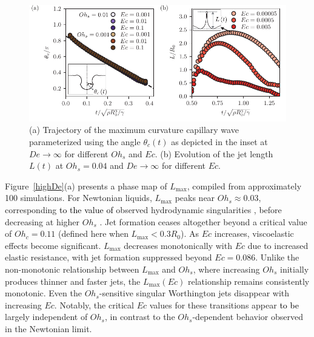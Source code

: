 \documentclass{jfm}
\newcommand{\DL}[1]{{\textcolor{black}{#1}}}
\newcommand{\AO}[1]{{\textcolor{black}{#1}}}
\begin{document}
\begin{figure}
	\includegraphics[width=\textwidth]{theta_t_02-eps-converted-to.pdf}
	\caption{(a) Trajectory of the maximum curvature capillary wave parameterized using the angle $\theta_c(t)$ as depicted in the inset at $De \to \infty$ for different $Oh_s$ and $Ec$. (b) Evolution of the jet length $L(t)$ at $Oh_s = 0.04$ and $De \to \infty$ for different $Ec$.}
	\label{theta_time}
\end{figure}

Figure~\ref{highDe}(a) presents a phase map of $L_{\text{max}}$, compiled from approximately 100 simulations.
For Newtonian liquids, $L_{\text{max}}$ peaks near $Oh_s \approx 0.03$, corresponding \AO{to the value of} observed hydrodynamic singularities \citep{zeff2000singularity,lohse2003bubble,eggers2015singularities,yang2020multitude}, before decreasing at higher $Oh_s$ \citep{duchemin2002jet,deike2018dynamics,gordillo2019capillary}.
Jet formation ceases altogether beyond a critical value of $Oh_c = 0.11$ \citep{sanjay2021bursting} (defined here when $L_\text{max} < 0.3R_0$).
As $Ec$ increases, viscoelastic effects become significant. $L_{\text{max}}$ decreases monotonically with $Ec$ due to increased elastic resistance, with jet formation suppressed beyond $Ec=0.086$. Unlike the non-monotonic relationship between $L_{\text{max}}$ and $Oh_s$, where increasing $Oh_s$ initially produces thinner and faster jets, the $L_{\text{max}}(Ec)$ relationship remains consistently monotonic. Even the $Oh_s$-sensitive singular Worthington jets disappear with increasing $Ec$. Notably, the critical $Ec$ values for these transitions appear \DL{to be} largely independent of $Oh_s$, in contrast to the $Oh_s$-dependent behavior observed in the Newtonian limit.
\end{document}
